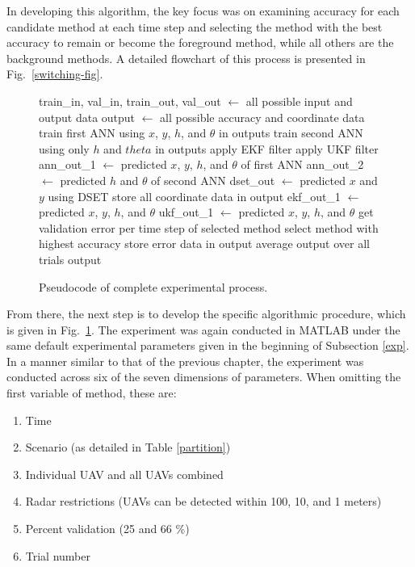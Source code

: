 \documentclass[12pt]{uthesis-v12}  %
\begin{document}
In developing this algorithm, the key focus was on examining accuracy for each candidate method at each time step and selecting the method with the best accuracy to remain or become the foreground method, while all others are the background methods. A detailed flowchart of this process is presented in Fig.~\ref{switching-fig}.
\begin{figure}
\begin{algorithmic}[1]
\STATE train\_in, val\_in, train\_out, val\_out $\leftarrow$ all possible input and output data
\STATE output $\leftarrow$ all possible accuracy and coordinate data
				\STATE train first ANN using $x$, $y$, $h$, and $\theta$ in outputs
				\STATE train second ANN using only $h$ and $theta$ in outputs
					\STATE apply EKF filter
					\STATE apply UKF filter
				\ENDFOR
					\STATE ann\_out\_1 $\leftarrow$ predicted $x$, $y$, $h$, and $\theta$ of first ANN
					\STATE ann\_out\_2 $\leftarrow$ predicted $h$ and $\theta$ of second ANN
						\STATE dset\_out $\leftarrow$ predicted $x$ and $y$ using DSET
						\STATE store all coordinate data in output
					\ENDFOR
					\STATE ekf\_out\_1 $\leftarrow$ predicted $x$, $y$, $h$, and $\theta$
					\STATE ukf\_out\_1 $\leftarrow$ predicted $x$, $y$, $h$, and $\theta$  
					\STATE get validation error per time step of selected method
						\STATE select method with highest accuracy
					\ENDIF	
					\STATE store error data in output
				\ENDFOR
			\ENDFOR
		\ENDFOR
		\ENDFOR
	\ENDFOR
\ENDFOR
\STATE average output over all trials
\RETURN output
\label{switching}
\end{algorithmic}
\caption{Pseudocode of complete experimental process.} 
\label{switching}
\end{figure}	
From there, the next step is to develop the specific algorithmic procedure, which is given in Fig.~\ref{switching}. The experiment was again conducted in MATLAB under the same default experimental parameters given in the beginning of Subsection \ref{exp}. In a manner similar to that of the previous chapter, the experiment was conducted across six of the seven dimensions of parameters. When omitting the first variable of method, these are:
\begin{enumerate}
\item Time
\item Scenario (as detailed in Table \ref{partition})
\item Individual UAV and all UAVs combined
\item Radar restrictions (UAVs can be detected within 100, 10, and 1 meters)
\item Percent validation (25 and 66 \%)
\item Trial number
\end{enumerate}
\end{document}
